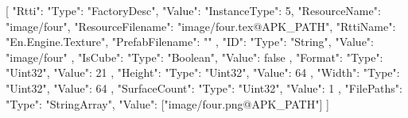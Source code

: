 [{
        "Rtti": {
            "Type": "FactoryDesc",
            "Value": {
                "InstanceType": 5,
                "ResourceName": "image/four",
                "ResourceFilename": "image/four.tex@APK_PATH",
                "RttiName": "En.Engine.Texture",
                "PrefabFilename": ""
            }
        },
        "ID": {
            "Type": "String",
            "Value": "image/four"
        },
        "IsCube": {
            "Type": "Boolean",
            "Value": false
        },
        "Format": {
            "Type": "Uint32",
            "Value": 21
        },
        "Height": {
            "Type": "Uint32",
            "Value": 64
        },
        "Width": {
            "Type": "Uint32",
            "Value": 64
        },
        "SurfaceCount": {
            "Type": "Uint32",
            "Value": 1
        },
        "FilePaths": {
            "Type": "StringArray",
            "Value": ["image/four.png@APK_PATH"]
        }
    }]